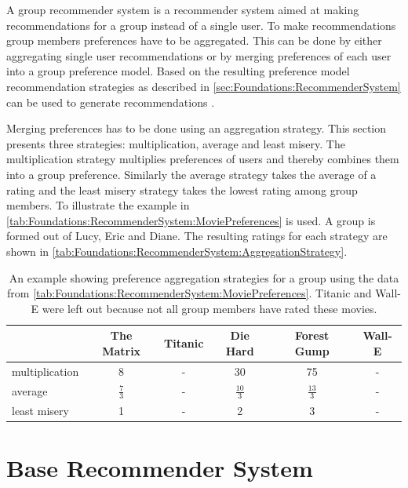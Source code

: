 A group recommender system is a recommender system aimed at making recommendations for a group instead of a single user. To make recommendations group members preferences have to be aggregated. This can be done by either aggregating single user recommendations or by merging preferences of each user into a group preference model. Based on the resulting preference model recommendation strategies as described in \autoref{sec:Foundations:RecommenderSystem} can be used to generate recommendations \cite{jamesonRecommendationGroups2007}.


Merging preferences has to be done using an aggregation strategy. This section presents three strategies: multiplication, average and least misery. The multiplication strategy multiplies preferences of users and thereby combines them into a group preference. Similarly the average strategy takes the average of a rating and the least misery strategy takes the lowest rating among group members. To illustrate the example in \autoref{tab:Foundations:RecommenderSystem:MoviePreferences} is used. A group is formed out of Lucy, Eric and Diane. The resulting ratings for each strategy are shown in \autoref{tab:Foundations:RecommenderSystem:AggregationStrategy}.

\begin{table}
    \centering    
    \begin{tabular}{ l | c | c | c | c | c }
        & The Matrix & Titanic & Die Hard & Forest Gump & Wall-E \\ \hline
         multiplication  & 8 & - & 30 & 75 & - \\
         average  & $\frac{7}{3}$ & - & $\frac{10}{3}$ & $\frac{13}{3}$ & - \\
         least misery  & 1 & - & 2 & 3 & - \\
    \end{tabular}
    \caption{An example showing preference aggregation strategies for a group using the data from \autoref{tab:Foundations:RecommenderSystem:MoviePreferences}. Titanic and Wall-E were left out because not all group members have rated these movies.}
    
    \label{tab:Foundations:RecommenderSystem:AggregationStrategy}
\end{table}


\section{Base Recommender System}
\label{sec:Foundations:BaseSystem}

